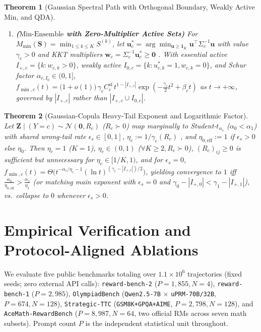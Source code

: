 \documentclass{article}
\theoremstyle{plain}
\newtheorem{theorem}{Theorem}
\theoremstyle{definition}
\theoremstyle{remark}
\begin{document}
\begin{theorem}[Gaussian Spectral Path with Orthogonal Boundary, Weakly Active $\mathrm{Min}$, and QDA]
\begin{enumerate}[leftmargin=1.6em,itemsep=2pt,topsep=1pt]
    \item \textbf{($\mathrm{Min\text{-}Ensemble}$ with Zero-Multiplier Active Sets)} For $M_{\min}(\mathbf{S}) = \min_{1\le k\le K} S^{(k)}$, let $\mathbf{u}_c^* = \arg\min_{\mathbf{u}\ge\mathbf{1}_K}\mathbf{u}^\top\Sigma_c^{-1}\mathbf{u}$ with value $\gamma_c > 0$ and KKT multipliers $\mathbf{w}_c = \Sigma_c^{-1}\mathbf{u}_c^* \ge \mathbf{0}$ \citep{savage1962mills,hashorva2003multivariate}. With essential active $I_{+,c} = \{k : w_{c,k} > 0\}$, weakly active $I_{0,c} = \{k : u_{c,k}^*=1, w_{c,k}=0\}$, and Schur factor $\alpha_{c, I_0} \in (0, 1]$, $f_{\min, c}(t) = \big(1 + o(1)\big)\, \gamma_c C_c^{\mathrm{sf}}\, t^{1 - |I_{+,c}|}\exp\!\left(-\frac{\gamma_c}{2}t^2 + \beta_c t\right)$ as $t \to +\infty$, governed by $|I_{+,c}|$ rather than $|I_{+,c} \cup I_{0,c}|$.
\end{enumerate}
\end{theorem}

\begin{theorem}[Gaussian-Copula Heavy-Tail Exponent and Logarithmic Factor]
\label{thm:copula}
Let $\mathbf{Z} \mid (Y=c) \sim \mathcal{N}(\mathbf{0}, R_c)$ ($R_c \succ 0$) map marginally to Student-$t_{\alpha_c}$ ($\alpha_0 < \alpha_1$) with shared wrong-tail rate $\epsilon_s \in [0, 1]$, $\eta_c := 1/\gamma_c(R_c)$ \citep{tankov2016tails,das2024heavy}, and $\eta_{0,\mathrm{eff}} := 1$ if $\epsilon_s > 0$ else $\eta_0$. Then $\eta_c = 1$ ($K=1$), $\eta_c \in (0, 1)$ ($\forall K \ge 2, R_c \succ 0$), $(R_c)_{ij} \ge 0$ is sufficient but unnecessary for $\eta_c \in [1/K, 1)$, and for $\epsilon_s = 0$, $f_{\min, c}(t) = \Theta\big(t^{-\alpha_c/\eta_c - 1}(\ln t)^{(\gamma_c - |I_{+,c}|)/2}\big)$, yielding convergence to $1$ iff $\frac{\alpha_0}{\eta_{0,\mathrm{eff}}} > \frac{\alpha_1}{\eta_1}$ (or matching main exponent with $\epsilon_s = 0$ and $\gamma_0 - |I_{+,0}| < \gamma_1 - |I_{+,1}|$), vs.\ collapse to $0$ whenever $\epsilon_s > 0$.
\end{theorem}

\section{Empirical Verification and Protocol-Aligned Ablations}
\label{sec:experiments}

We evaluate five public benchmarks totaling over $1.1\times 10^6$ trajectories (fixed seeds; zero external API calls): \texttt{reward-bench-2} ($P=1{,}855, N=4$), \texttt{reward-bench-1} ($P=2{,}985$), \texttt{OlympiadBench} (\texttt{Qwen2.5-7B} $\times$ \texttt{uPRM-70B/32B}, $P=674, N=128$), \texttt{Strategic-TTC} (\texttt{GSM8K+GPQA+AIME}, $P=2{,}798, N=128$), and \texttt{AceMath-RewardBench} ($P=8{,}987, N=64$, two official RMs across seven math subsets). Prompt count $P$ is the independent statistical unit throughout.
\end{document}

